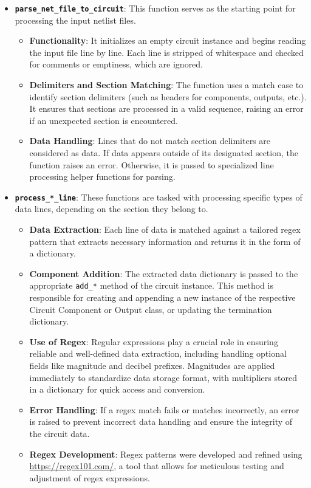 \documentclass[conference]{IEEEtran}
\begin{document}
\begin{itemize}
  \item \textbf{\texttt{parse\_net\_file\_to\_circuit}}: This function serves as the starting point for processing the input netlist files.
        \begin{itemize}
          \item \textbf{Functionality}: It initializes an empty circuit instance and begins reading the input file line by line. 
          Each line is stripped of whitespace and checked for comments or emptiness, which are ignored.
          \item \textbf{Delimiters and Section Matching}: The function uses a match case to identify section delimiters 
          (such as headers for components, outputs, etc.). It ensures that sections are processed in a valid sequence, 
          raising an error if an unexpected section is encountered.
          \item \textbf{Data Handling}: Lines that do not match section delimiters are considered as data. If data appears 
          outside of its designated section, the function raises an error. Otherwise, it is passed to specialized line processing 
          helper functions for parsing.
        \end{itemize}

  \item \textbf{\texttt{process\_*\_line}}: These functions are tasked with processing specific types of data lines, depending on 
  the section they belong to.
        \begin{itemize}
          \item \textbf{Data Extraction}: Each line of data is matched against a tailored regex pattern that extracts necessary 
          information and returns it in the form of a dictionary.
          \item \textbf{Component Addition}: The extracted data dictionary is passed to the appropriate \texttt{add\_*} method 
          of the circuit instance. This method is responsible for creating and appending a new instance of the respective Circuit 
          Component or Output class, or updating the termination dictionary.
          \item \textbf{Use of Regex}: Regular expressions play a crucial role in ensuring reliable and well-defined data extraction, 
          including handling optional fields like magnitude and decibel prefixes. Magnitudes are applied immediately to standardize 
          data storage format, with multipliers stored in a dictionary for quick access and conversion.
          \item \textbf{Error Handling}: If a regex match fails or matches incorrectly, an error is raised to prevent incorrect data 
          handling and ensure the integrity of the circuit data.
          \item \textbf{Regex Development}: Regex patterns were developed and refined using \url{https://regex101.com/}, a tool that 
          allows for meticulous testing and adjustment of regex expressions.
        \end{itemize}
\end{itemize}
\end{document}
